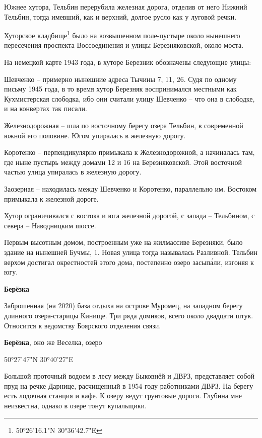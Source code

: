 Южнее хутора, Тельбин перерубила железная дорога, отделив от него Нижний Тельбин, тогда имевший, как и верхний, долгое русло как у луговой речки.

Хуторское кладбище\footnote{50°26'16.1"N 30°36'42.7"E} было на возвышенном поле-пустыре около нынешнего пересечения проспекта Воссоединения и улицы Березняковской, около моста.

На немецкой карте 1943 года, в хуторе Березник обозначены следующие улицы: 

Шевченко – примерно нынешние адреса Тычины 7, 11, 26. Судя по одному письму 1945 года, в то время хутор Березняк воспринимался местными как Кухмистерская слободка, ибо они считали улицу Шевченко – что она в слободке, и на конвертах так писали.

Железнодорожная – шла по восточному берегу озера Тельбин, в современной южной его половине. Югом упиралась в железную дорогу.

Коротенко – перпендикулярно примыкала к Железнодорожной, а начиналась там, где ныне пустырь между домами 12 и 16 на Березняковской. Этой восточной частью улица упиралась в железную дорогу.

Заозерная – находилась между Шевченко и Коротенко, параллельно им. Востоком примыкала к железной дороге.

Хутор ограничивался с востока и юга железной дорогой, с запада – Тельбином, с севера – Наводницким шоссе.

Первым высотным домом, построенным уже на жилмассиве Березняки, было здание на нынешней Бучмы, 1. Новая улица тогда называлась Разливной. Тельбин верхом достигал окре\-стностей этого дома, постепенно озеро засып\'али, изгоняя к югу.\\

\medskip

\textbf{Берёзка} 

Заброшенная (на 2020) база отдыха на острове Муромец, на западном берегу длинного озера-старицы Кинище. Три ряда домиков, всего около двадцати штук. Относится к ведомству Боярского отделения связи.\\

\medskip

\textbf{Берёзка}, оно же Веселка, озеро

50°27'47"N 30°40'27"E

Большой проточный водоем в лесу между Быковнёй и ДВРЗ, представляет собой пруд на речке Дарнице, расчищенный в 1954 году работниками ДВРЗ. На берегу есть лодочная станция и кафе. К озеру ведут грунтовые дороги. Глубина мне неизвестна, однако в озере тонут купальщики.

